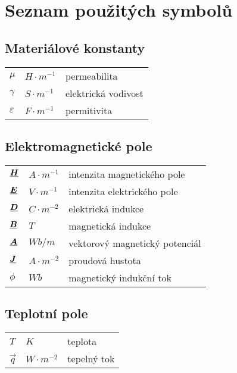 \chapter{Seznam použitých symbolů}

\section{Materiálové konstanty}
\begin{tabular}{lll}
	$\mu$ & $\unit{H\cdot m^{-1}}$ & permeabilita\\
	$\gamma$ & $\unit{S\cdot m^{-1}}$ & elektrická vodivost\\
	$\varepsilon$ & $\unit{F\cdot m^{-1}}$ & permitivita\\
\end{tabular}

\section{Elektromagnetické pole}
\begin{tabular}{lll}
	$\mbox{\underline{\boldmath$H$}}$ & $\unit{A\cdot m^{-1}}$ & intenzita magnetického pole\\
	$\mbox{\underline{\boldmath$E$}}$ & $\unit{V\cdot m^{-1}}$ & intenzita elektrického pole\\
	$\mbox{\underline{\boldmath$D$}}$ & $\unit{C\cdot m^{-2}}$ & elektrická indukce\\
	$\mbox{\underline{\boldmath$B$}}$ & $\unit{T}$ & magnetická indukce\\
	$\mbox{\underline{\boldmath$A$}}$ & $\unit{Wb/m}$ & vektorový magnetický potenciál\\
	$\mbox{\underline{\boldmath$J$}}$ & $\unit{A\cdot m^{-2}}$ & proudová hustota\\
	$\phi$ & $\unit{Wb}$ & magnetický indukční tok\\
\end{tabular}

\section{Teplotní pole}
\begin{tabular}{lll}
	$T$ & $\unit{K}$ & teplota\\
	$\vec{q}$ & $\unit{W\cdot m^{-2}}$ & tepelný tok
\end{tabular}


